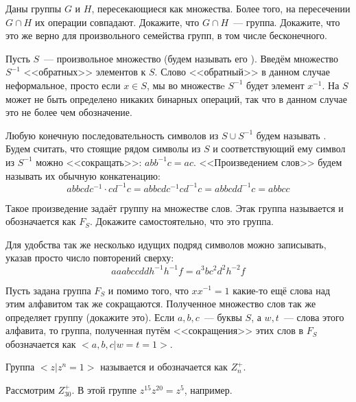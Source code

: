 \begin{exercise}\label{ex:grpint}
	Даны группы $G$ и $H$, пересекающиеся как множества. Более того, на пересечении $G\cap H$ их операции совпадают. Докажите, что $G\cap H$~--- группа. Докажите, что это же верно для произвольного семейства групп, в том числе бесконечного.
\end{exercise}

\begin{example}
	Пусть $S$~--- произвольное множество (будем называть его ). Введём множество $S^{-1}$ <<обратных>> элементов к $S$. Слово <<обратный>> в данном случае неформальное, просто если $x\in S$, мы во множествe $S^{-1}$ будет элемент $x^{-1}$. На $S$ может не быть определено никаких бинарных операций, так что в данном случае это не более чем обозначение.
	
	Любую конечную последовательность символов из $S\cup S^{-1}$ будем называть . Будем считать, что стоящие рядом символы из $S$ и соответствующий ему символ из $S^{-1}$ можно <<сокращать>>: $abb^{-1}c = ac$. <<Произведением слов>> будем называть их обычную конкатенацию:
	\[
	abbcdc^{-1} \cdot cd^{-1}c = abbcdc^{-1}cd^{-1}c = abbcdd^{-1}c = abbcc
	\]
	
	Такое произведение задаёт группу на множестве слов. Этак группа называется  и обозначается как $F_S$. Докажите самостоятельно, что это группа.
\end{example}

Для удобства так же несколько идущих подряд символов можно записывать, указав просто число повторений сверху:
\[
aaabccddh^{-1}h^{-1}f = a^3 b c^2 d^2 h^{-2} f
\]

Пусть задана группа $F_S$ и помимо того, что $xx^{-1}=1$ какие-то ещё слова над этим алфавитом так же сокращаются. Полученное множество слов так же определяет группу (докажите это). Если $a, b, c$~--- буквы $S$, а $w, t$~--- слова этого алфавита, то группа, полученная путём <<сокращения>> этих слов в $F_S$ обозначается как $<a, b, c | w = t = 1>$.

\begin{example}
	Группа $<z|z^n = 1>$ называется  и обозначается как $Z_n^+$.
\end{example}

\begin{example}
	Рассмотрим $Z_{30}^+$. В этой группе $z^{15}z^{20} = z^5$, например.
\end{example}


